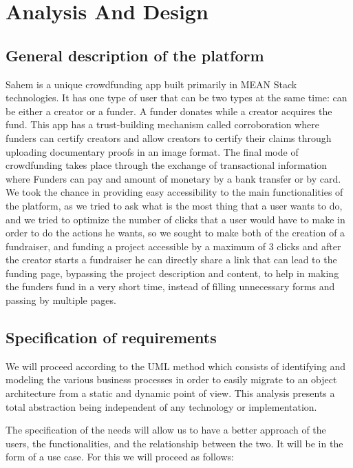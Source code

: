 

\setcounter{mtc}{9}
\chapter{Analysis And Design}%
\label{chap:chapter_two}
\minitoc
\section{General description of the platform}
Sahem is a unique crowdfunding app built primarily in MEAN Stack technologies. It has one type of user that can be two types at the same time: can be either a creator or a funder. A funder donates while a creator acquires the fund. This app has a trust-building mechanism called corroboration where funders can certify creators and allow creators to certify their claims through uploading documentary proofs in an image format. The final mode of crowdfunding takes place through the exchange of transactional information where Funders can pay and amount of monetary by a bank transfer or by card.
We took the chance in providing easy accessibility to the main functionalities of the platform, as we tried to ask what is the most thing that a user wants to do, and we tried to optimize the number of clicks that a user would have to make in order to do the actions he wants, so we sought to make both of the creation of a fundraiser, and funding a project accessible by a maximum of 3 clicks and after the creator starts a fundraiser he can directly share a link that can lead to the funding page, bypassing the project description and content, to help in making the funders fund in a very short time, instead of filling unnecessary forms and passing by multiple pages.

\section{Specification of requirements}
We will proceed according to the UML method which consists of identifying and modeling the various business processes in order to easily migrate to an object architecture from a static and dynamic point of view. This analysis presents a total abstraction being independent of any technology or implementation.

The specification of the needs will allow us to have a better approach of the users, the functionalities, and the relationship between the two. It will be in the form of a use case. For this we will proceed as follows:

